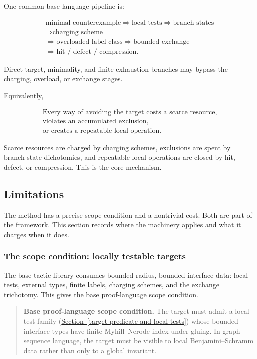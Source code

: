 \documentclass[
  11pt,
]{article}
\theoremstyle{definition}
\newcommand{\secref}[1]{\hyperref[#1]{Section~\ref*{#1}}}
\begin{document}
One common base-language pipeline is:

\[
\begin{gathered}
\text{minimal counterexample}
\Rightarrow
\text{local tests}
\Rightarrow
\text{branch states}\\
\Rightarrow
\text{charging scheme}\\
\Rightarrow
\text{overloaded label class}
\Rightarrow
\text{bounded exchange}\\
\Rightarrow
\text{hit / defect / compression}.
\end{gathered}
\]

Direct target, minimality, and finite-exhaustion branches may bypass the
charging, overload, or exchange stages.

Equivalently,

\[
\boxed{
\begin{gathered}
\text{Every way of avoiding the target costs a scarce resource,}\\
\text{violates an accumulated exclusion,}\\
\text{or creates a repeatable local operation.}
\end{gathered}
}
\]

Scarce resources are charged by charging schemes, exclusions are spent
by branch-state dichotomies, and repeatable local operations are closed
by hit, defect, or compression. This is the core mechanism.

\subsection{Limitations}\label{limitations}

The method has a precise scope condition and a nontrivial cost. Both are
part of the framework. This section records where the machinery applies
and what it charges when it does.

\subsubsection{The scope condition: locally testable
targets}\label{the-scope-condition-locally-testable-targets}

The base tactic library consumes bounded-radius, bounded-interface data:
local tests, external types, finite labels, charging schemes, and the
exchange trichotomy. This gives the base proof-language scope condition.

\begin{quote}
\textbf{Base proof-language scope condition.} The target must admit a local test family
(\secref{target-predicate-and-local-tests}) whose bounded-interface types have finite Myhill--Nerode
index under gluing. In graph-sequence language, the target must be
visible to local Benjamini--Schramm data rather than only to a global
invariant.
\end{quote}
\end{document}
